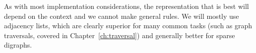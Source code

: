As with most implementation considerations, the representation that is best will depend on the context and we cannot make general rules.  We will mostly use adjacency lists, which are
clearly superior for many common tasks (such as graph traversals, covered
in Chapter~\ref{ch:traversal}) and generally better for sparse digraphs.


%

